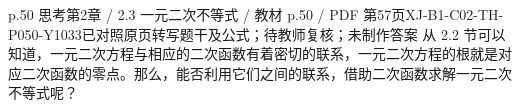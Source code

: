 \par\noindent\begin{minipage}{\linewidth}
\begin{bankitem}{p.50 思考}{第2章 / 2.3 一元二次不等式 / 教材 p.50 / PDF 第57页}{XJ-B1-C02-TH-P050-Y1033}{已对照原页转写题干及公式；待教师复核；未制作答案}
从 2.2 节可以知道，一元二次方程与相应的二次函数有着密切的联系，一元二次方程的根就是对应二次函数的零点。那么，能否利用它们之间的联系，借助二次函数求解一元二次不等式呢？
\end{bankitem}
\end{minipage}\par\medskip
